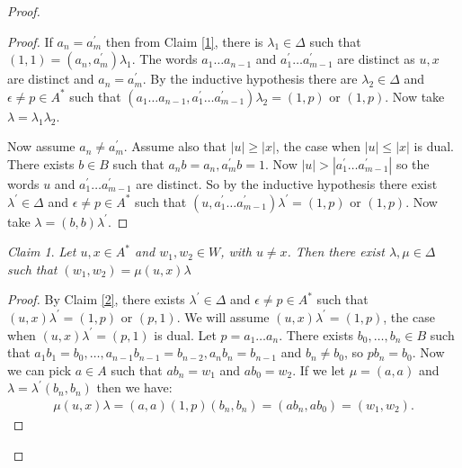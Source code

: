 \documentclass[a4paper, 12pt,reqno]{amsart}
\theoremstyle{plain}
\theoremstyle{definition}
\theoremstyle{remark}
\newtheorem{cclaim}{Claim}[thm]
\newenvironment{claim}{\begin{cclaim}\it}{\end{cclaim}}
\begin{document}
\begin{proof}
\begin{proof}
        If $a_n = a_m^\prime$ then from Claim \ref{1}, there is $\lambda_1 \in \Delta$ such that $(1,1) = (a_n,a_m^\prime) \lambda_1$.
        The words $a_1 \dots a_{n-1} $ and $a_1^\prime \dots a_{m-1}^\prime$ are distinct as $u,x$ are distinct and $a_n = a_m^\prime$.
        By the inductive hypothesis there are $\lambda_2 \in \Delta$ and $\epsilon\neq p \in A^\ast$ such that $(a_1\dots a_{n-1}, a_1^\prime \dots a_{m-1}^\prime) \lambda_2 = (1,p)$ or $(1,p)$. Now take $\lambda = \lambda_1 \lambda_2$.

        Now assume $a_n \neq a_m^\prime$.
        Assume also that $|u| \geq |x|$, the case when $|u| \leq |x|$ is dual.
        There exists $b \in B$ such that $a_n b = a_n,  a_m^\prime b = 1$. Now $|u| > |a_1^\prime \dots a_{m-1}^\prime |$ so the words $u$ and $a_1^\prime \dots a_{m-1}^\prime$ are distinct.
        So by the inductive hypothesis there exist $\lambda^\prime \in \Delta$ and $\epsilon\neq p \in A^\ast$ such that $(u,a_1^\prime \dots a_{m-1}^\prime) \lambda^\prime = (1,p)$ or $(1,p)$.
        Now take $\lambda = (b,b) \lambda^\prime$.
    \end{proof}
    


    \begin{claim}
        \label{3}
        Let $u, x\in A^\ast$ and $w_1,w_2\in W$, with $u\neq x$.         Then there exist $\lambda, \mu \in \Delta$ such that $(w_1,w_2) = \mu (u,x) \lambda$
    \end{claim}

    \begin{proof}
        By Claim \ref{2}, there exists $\lambda^\prime \in \Delta$ and $\epsilon\neq p\in A^\ast$ such that $(u,x)\lambda^\prime = (1,p)$ or $(p,1)$.
        We will assume $(u,x)\lambda^\prime = (1,p)$, the case when $(u,x)\lambda^\prime = (p,1)$ is dual.
        Let $p = a_1 \dots a_n$.
        There exists $b_0,\dots,b_n \in B$ such that $a_1 b_1 = b_0 , \dots , a_{n-1} b_{n-1} = b_{n-2} , a_n b_n = b_{n-1}$ and $b_n \neq b_0$, so $pb_n = b_0$.
        Now we can pick $a \in A$ such that $ab_n = w_1$ and $ab_0 = w_2$.
        If we let $\mu = (a,a)$ and $\lambda = \lambda^\prime (b_n , b_n)$ then we have:
        \begin{align*}
            \mu (u,x) \lambda  = (a,a)(1,p)(b_n,b_n) = (a b_n , a b_0) = (w_1 , w_2) .
        \end{align*}
    \end{proof}
    
    
    

\end{proof}
\end{document}

